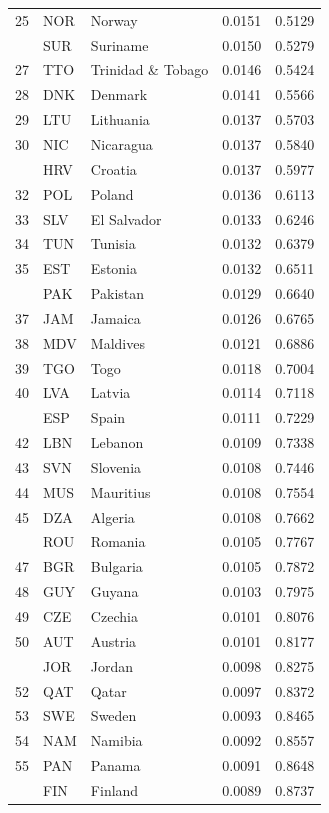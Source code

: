 \documentclass[referee,pdflatex,sn-basic]{sn-jnl}
\theoremstyle{thmstylethree}
\begin{document}
\begin{ThreePartTable}
\begin{longtable}[t]{rllrr}
25 & NOR & Norway & 0.0151 & 0.5129\\
\addlinespace
26 & SUR & Suriname & 0.0150 & 0.5279\\
27 & TTO & Trinidad \& Tobago & 0.0146 & 0.5424\\
28 & DNK & Denmark & 0.0141 & 0.5566\\
29 & LTU & Lithuania & 0.0137 & 0.5703\\
30 & NIC & Nicaragua & 0.0137 & 0.5840\\
\addlinespace
31 & HRV & Croatia & 0.0137 & 0.5977\\
32 & POL & Poland & 0.0136 & 0.6113\\
33 & SLV & El Salvador & 0.0133 & 0.6246\\
34 & TUN & Tunisia & 0.0132 & 0.6379\\
35 & EST & Estonia & 0.0132 & 0.6511\\
\addlinespace
36 & PAK & Pakistan & 0.0129 & 0.6640\\
37 & JAM & Jamaica & 0.0126 & 0.6765\\
38 & MDV & Maldives & 0.0121 & 0.6886\\
39 & TGO & Togo & 0.0118 & 0.7004\\
40 & LVA & Latvia & 0.0114 & 0.7118\\
\addlinespace
41 & ESP & Spain & 0.0111 & 0.7229\\
42 & LBN & Lebanon & 0.0109 & 0.7338\\
43 & SVN & Slovenia & 0.0108 & 0.7446\\
44 & MUS & Mauritius & 0.0108 & 0.7554\\
45 & DZA & Algeria & 0.0108 & 0.7662\\
\addlinespace
46 & ROU & Romania & 0.0105 & 0.7767\\
47 & BGR & Bulgaria & 0.0105 & 0.7872\\
48 & GUY & Guyana & 0.0103 & 0.7975\\
49 & CZE & Czechia & 0.0101 & 0.8076\\
50 & AUT & Austria & 0.0101 & 0.8177\\
\addlinespace
51 & JOR & Jordan & 0.0098 & 0.8275\\
52 & QAT & Qatar & 0.0097 & 0.8372\\
53 & SWE & Sweden & 0.0093 & 0.8465\\
54 & NAM & Namibia & 0.0092 & 0.8557\\
55 & PAN & Panama & 0.0091 & 0.8648\\
\addlinespace
56 & FIN & Finland & 0.0089 & 0.8737\\

\end{longtable}
\end{ThreePartTable}
\end{document}
